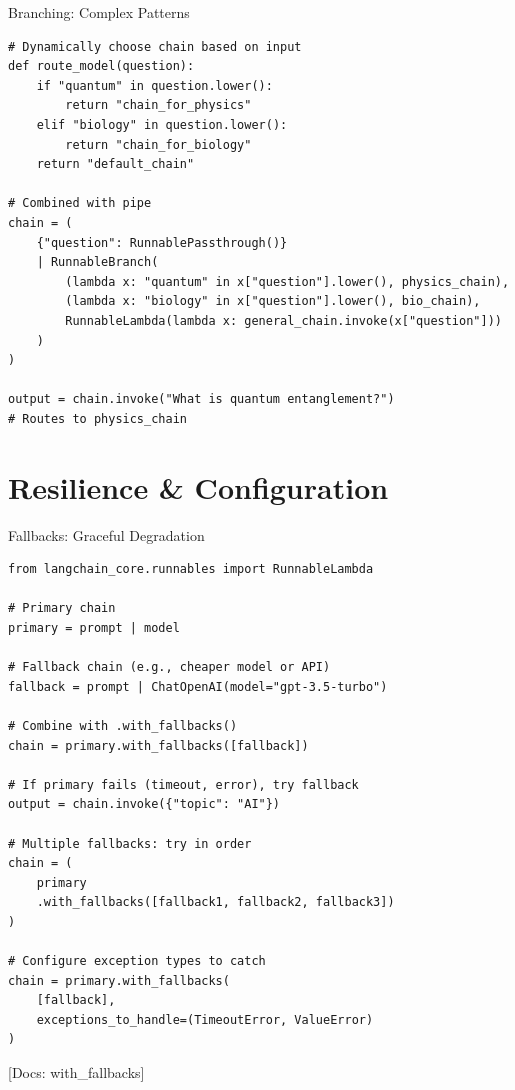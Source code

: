\documentclass[aspectratio=169,11pt]{beamer}
\newcommand{\docref}[1]{{\scriptsize\color{docgray}[Docs: #1]}}
\begin{document}
\begin{frame}[fragile]{Branching: Complex Patterns}
  \begin{codebox}
\begin{lstlisting}
# Dynamically choose chain based on input
def route_model(question):
    if "quantum" in question.lower():
        return "chain_for_physics"
    elif "biology" in question.lower():
        return "chain_for_biology"
    return "default_chain"

# Combined with pipe
chain = (
    {"question": RunnablePassthrough()}
    | RunnableBranch(
        (lambda x: "quantum" in x["question"].lower(), physics_chain),
        (lambda x: "biology" in x["question"].lower(), bio_chain),
        RunnableLambda(lambda x: general_chain.invoke(x["question"]))
    )
)

output = chain.invoke("What is quantum entanglement?")
# Routes to physics_chain
\end{lstlisting}
  \end{codebox}
\end{frame}

\section{Resilience \& Configuration}

\begin{frame}[fragile,shrink=3]{Fallbacks: Graceful Degradation}
  \begin{codebox}
\begin{lstlisting}
from langchain_core.runnables import RunnableLambda

# Primary chain
primary = prompt | model

# Fallback chain (e.g., cheaper model or API)
fallback = prompt | ChatOpenAI(model="gpt-3.5-turbo")

# Combine with .with_fallbacks()
chain = primary.with_fallbacks([fallback])

# If primary fails (timeout, error), try fallback
output = chain.invoke({"topic": "AI"})

# Multiple fallbacks: try in order
chain = (
    primary
    .with_fallbacks([fallback1, fallback2, fallback3])
)

# Configure exception types to catch
chain = primary.with_fallbacks(
    [fallback],
    exceptions_to_handle=(TimeoutError, ValueError)
)
\end{lstlisting}
  \end{codebox}

  \docref{with\_fallbacks}
\end{frame}
\end{document}
